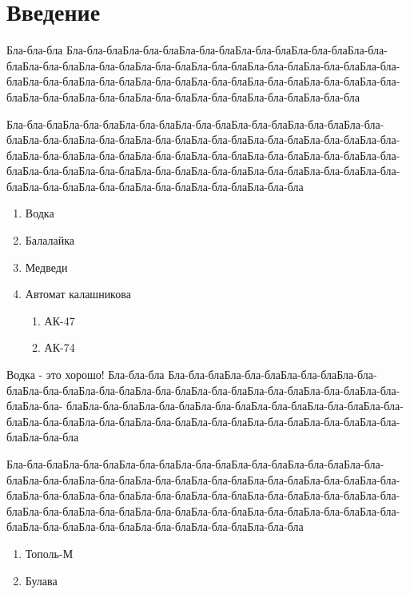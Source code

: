 \chapter*{Введение}

Бла-бла-бла Бла-бла-блаБла-бла-блаБла-бла-блаБла-бла-блаБла-бла-блаБла-бла-блаБла-бла-блаБла-бла-блаБла-бла-блаБла-бла-блаБла-бла-блаБла-бла-блаБла-бла-блаБла-бла-блаБла-бла-блаБла-бла-блаБла-бла-блаБла-бла-блаБла-бла-блаБла-бла-блаБла-бла-блаБла-бла-блаБла-бла-блаБла-бла-блаБла-бла-блаБла-бла-бла

Бла-бла-блаБла-бла-блаБла-бла-блаБла-бла-блаБла-бла-блаБла-бла-блаБла-бла-блаБла-бла-блаБла-бла-блаБла-бла-блаБла-бла-блаБла-бла-блаБла-бла-блаБла-бла-блаБла-бла-блаБла-бла-блаБла-бла-блаБла-бла-блаБла-бла-блаБла-бла-блаБла-бла-блаБла-бла-блаБла-бла-блаБла-бла-блаБла-бла-блаБла-бла-блаБла-бла-блаБла-бла-блаБла-бла-блаБла-бла-блаБла-бла-блаБла-бла-блаБла-бла-бла

\begin{enumerate}
	\item Водка
	\item Балалайка
	\item Медведи
	\item Автомат калашникова
	\begin{enumerate}
		\item АК-47
		\item АК-74
	\end{enumerate}
\end{enumerate}

Водка - это хорошо!
Бла-бла-бла Бла-бла-блаБла-бла-блаБла-бла-блаБла-бла-блаБла-бла-блаБла-бла-блаБла-бла-блаБла-бла-блаБла-бла-блаБла-бла-блаБла-бла-блаБла-бла- блаБла-бла-блаБла-бла-блаБла-бла-блаБла-бла-блаБла-бла-блаБла-бла-блаБла-бла-блаБла-бла-блаБла-бла-блаБла-бла-блаБла-бла-блаБла-бла-блаБла-бла-блаБла-бла-бла

Бла-бла-блаБла-бла-блаБла-бла-блаБла-бла-блаБла-бла-блаБла-бла-блаБла-бла-блаБла-бла-блаБла-бла-блаБла-бла-блаБла-бла-блаБла-бла-блаБла-бла-блаБла-бла-блаБла-бла-блаБла-бла-блаБла-бла-блаБла-бла-блаБла-бла-блаБла-бла-блаБла-бла-блаБла-бла-блаБла-бла-блаБла-бла-блаБла-бла-блаБла-бла-блаБла-бла-блаБла-бла-блаБла-бла-блаБла-бла-блаБла-бла-блаБла-бла-блаБла-бла-бла

\begin{enumerate}
	\item Тополь-М
	\item Булава
\end{enumerate}